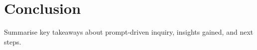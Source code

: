 \documentclass[11pt,a4paper]{article}
\begin{document}
	\section{Conclusion}
	Summarise key takeaways about prompt‑driven inquiry, insights gained,
	and next steps.
	
%	
	
	
	
\end{document}
